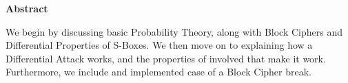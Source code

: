 
\begin{center}
\Large \bf Abstract
\end{center}

We begin by discussing basic Probability Theory, along with Block
Ciphers and Differential Properties of S-Boxes. We then move
on to explaining how a Differential Attack works, and the 
properties of involved that make it work. Furthermore, we include
and implemented case of a Block Cipher break.

\begin{comment}
Brief description of your project, i.e., say what you're going to
do.  Something like ``We describe Manuel Blum's protocol for coin
flipping over the telephone, filling in a bunch of number
theoretic background''.
\end{comment}
